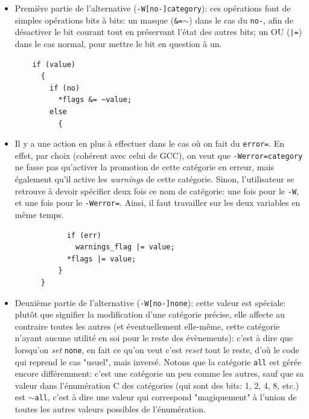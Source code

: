 \documentclass[a4paper,11pt,twoside,final]{article}
\begin{document}
  \begin{itemize}
    \item Première partie de l'alternative (\texttt{-W[no-]category}): ces
      opérations font de simples opérations bits à bits: un masque
      (\texttt{\&=$\sim$}) dans le cas du \texttt{no-}, afin de
      désactiver le bit courant tout en préservant l'état des autres bits; un
      OU (\texttt{|=}) dans le cas normal, pour mettre le bit en question à un.


  \begin{verbatim}
    if (value)
      {
        if (no)
          *flags &= ~value;
        else
          {
  \end{verbatim}

    \item Il y a une action en plus à effectuer dans le
      cas où on fait du \texttt{error=}. En effet, par choix (cohérent avec
      celui de GCC), on veut que \texttt{-Werror=category} ne fasse pas
      qu'activer la promotion de cette catégorie en erreur, mais également
      qu'il active les \textit{warnings} de cette catégorie. Sinon,
      l'utilisateur se retrouve à devoir spécifier deux fois ce nom de
      catégorie: une fois pour le \texttt{-W}, et une fois pour le
      \texttt{-Werror=}. Ainsi, il faut travailler sur les deux variables en
      même temps.

  \begin{verbatim}
            if (err)
              warnings_flag |= value;
            *flags |= value;
          }
      }
  \end{verbatim}

    \item Deuxième partie de l'alternative (\texttt{-W[no-]none}): cette valeur
      est spéciale: plutôt que signifier la modification d'une catégorie
      précise, elle affecte au contraire toutes les autres (et éventuellement
      elle-même, cette catégorie n'ayant aucune utilité en soi pour le reste
      des évènements): c'est à dire que lorsqu'on \textit{set} \texttt{none},
      en fait ce qu'on veut c'est \textit{reset} tout le reste, d'où le code
      qui reprend le cas "usuel", mais inversé. Notons que la catégorie
      \texttt{all} est gérée encore différemment: c'est une catégorie un peu
      comme les autres, sauf que sa valeur dans l'énumération C des catégories
      (qui sont des bits: 1, 2, 4, 8, etc.) est \texttt{$\sim$all}, c'est à
      dire une valeur qui correspond "magiquement" à l'union de toutes les
      autres valeurs possibles de l'énumération.


\end{itemize}
\end{document}
